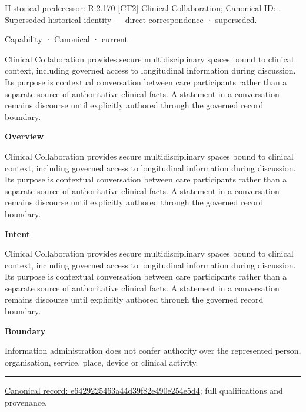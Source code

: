 {\small Historical predecessor: R.2.170 \hyperref[element:c5adc1955b6046d8b920b0176cebc9de]{[CT2] Clinical Collaboration}; Canonical ID: \texttt{}. Superseded historical identity — direct correspondence · superseded.}\par
\label{element:e6429225463a44d39f82e490e254e5d4}
{\small Capability · Canonical · current}\par

Clinical Collaboration provides secure multidisciplinary spaces bound to clinical context, including governed access to longitudinal information during discussion. Its purpose is contextual conversation between care participants rather than a separate source of authoritative clinical facts. A statement in a conversation remains discourse until explicitly authored through the governed record boundary.



\textbf{Overview}



Clinical Collaboration provides secure multidisciplinary spaces bound to clinical context, including governed access to longitudinal information during discussion. Its purpose is contextual conversation between care participants rather than a separate source of authoritative clinical facts. A statement in a conversation remains discourse until explicitly authored through the governed record boundary.



\textbf{Intent}



Clinical Collaboration provides secure multidisciplinary spaces bound to clinical context, including governed access to longitudinal information during discussion. Its purpose is contextual conversation between care participants rather than a separate source of authoritative clinical facts. A statement in a conversation remains discourse until explicitly authored through the governed record boundary.



\textbf{Boundary}



Information administration does not confer authority over the represented person, organisation, service, place, device or clinical activity.



\medskip\hrule\medskip

{\footnotesize \href{../../../../../../../continuum/strategy/capability/e6429225463a44d39f82e490e254e5d4.md}{Canonical record: e6429225463a44d39f82e490e254e5d4}; full qualifications and provenance.}\par
